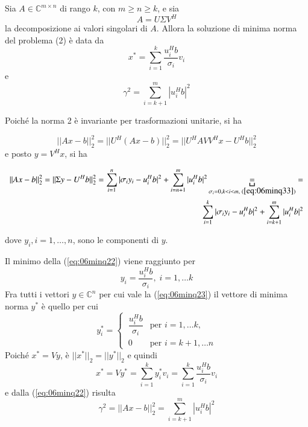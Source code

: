 \begin{theo}
 Sia $A \in  \mathbb{C}^{m \times n}$
 di rango $k$, con $m \geq n \geq k$, e sia
$$A = U \Sigma V^H$$
la decomposizione ai valori singolari di $A$. 
Allora la soluzione di minima norma del problema (2) \`e data da
$$
x^{*} = \displaystyle \sum_{i=1}^{k}
\dfrac{u_i^{H}b}{\sigma_i}v_i
$$
e
$$
\gamma^2 = \displaystyle \sum_{i=k+1}^{m}
|u_i^{H} b|^{2}
$$
\end{theo}
\begin{thproof}
Poich\'e la norma 2 \`e invariante per trasformazioni unitarie, 
si ha

$$
||Ax -b ||_2^{2} =
|| U^{H}(Ax-b)||_2^{2} = ||U^{H}AVV^{H}x - U^{H}b||_2^2
$$
e posto $y = V^H x$, si ha

\begin{equation}
  \label{eq:06minq22}
\begin{split}
  || Ax - b||_2^{2} = || \Sigma y - U^{H}b||_2^{2} 
= \displaystyle \sum_{i=1}^{n} 
|\sigma_i y_i - u_i^{H} b|^{2} + \sum_{i=n+1}^{m} |u_i^{H}b|^{2}
\underbracket{=}_{\sigma _i = 0, k<i<m,  \; (\ref{eq:06minq33})}=  \\
\sum_{i=1}^{k} | \sigma_i y_i - u_i^{H}b|^{2} +
\sum_{i=k+1}^{m}|u_i^{H}b|^2
\end{split}
\end{equation}


  dove $y_i , i = 1, \ldots, n$, sono le componenti di $y$. 

Il minimo della (\ref{eq:06minq22}) viene raggiunto per
\begin{equation}
  \label{eq:06minq23}
  y_i = \dfrac{u_i^{H}b}{\sigma_i}, \; i=1,\ldots k
\end{equation}
Fra tutti i vettori $y \in \mathbb{C}^n$ per cui vale la
 (\ref{eq:06minq23}) il vettore di minima norma
$y^{*}$ \`e quello per cui
$$
y_i^{*} =
\left\{
\
\begin{array}{cl}
\dfrac{u_i^{H}b}{\sigma_i} & \text{per } i =1,\ldots k, \\
0 & \text{per }i = k+1, \ldots n  
\end{array}
\right.
$$
Poich\'e $x^{*} = Vy$, \`e $||x^*||_2 = ||y^{*}||_2$
e quindi
$$
x^{*} = Vy^{*} = \displaystyle \sum_{i=1}^{k} y_i^{*}v_i=
\sum_{i=1}^{k} \dfrac{u_i^{H}b}{\sigma_i}v_i
$$
e dalla (\ref{eq:06minq22}) risulta
$$ \gamma^{2} = ||Ax -b||_2^{2} = \displaystyle 
\sum_{i=k+1}^{m} |u_i^{H} b|^{2}
$$
\end{thproof}

